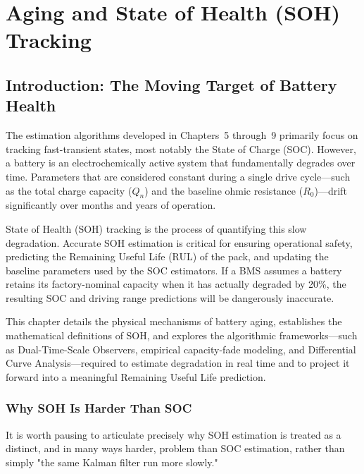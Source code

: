 
\chapter{Aging and State of Health (SOH) Tracking}
\label{ch:soh_tracking}

\section{Introduction: The Moving Target of Battery Health}
\label{sec:13_intro}

The estimation algorithms developed in Chapters~5 through~9 primarily focus on tracking fast-transient states, most notably the State of Charge (SOC). However, a battery is an electrochemically active system that fundamentally degrades over time. Parameters that are considered constant during a single drive cycle—such as the total charge capacity ($Q_n$) and the baseline ohmic resistance ($R_0$)—drift significantly over months and years of operation.

State of Health (SOH) tracking is the process of quantifying this slow degradation. Accurate SOH estimation is critical for ensuring operational safety, predicting the Remaining Useful Life (RUL) of the pack, and updating the baseline parameters used by the SOC estimators. If a BMS assumes a battery retains its factory-nominal capacity when it has actually degraded by 20\%, the resulting SOC and driving range predictions will be dangerously inaccurate.

This chapter details the physical mechanisms of battery aging, establishes the mathematical definitions of SOH, and explores the algorithmic frameworks—such as Dual-Time-Scale Observers, empirical capacity-fade modeling, and Differential Curve Analysis—required to estimate degradation in real time and to project it forward into a meaningful Remaining Useful Life prediction.

\subsection{Why SOH Is Harder Than SOC}
\label{subsec:13_why_hard}

It is worth pausing to articulate precisely why SOH estimation is treated as a distinct, and in many ways harder, problem than SOC estimation, rather than simply "the same Kalman filter run more slowly."

